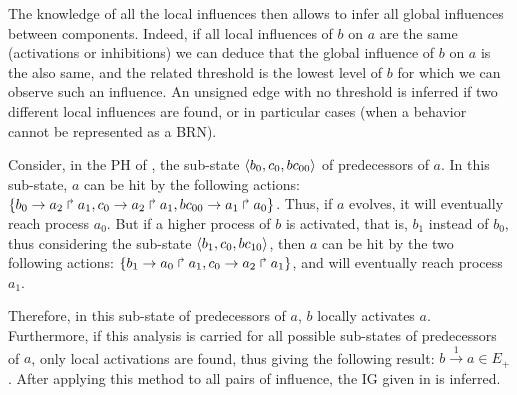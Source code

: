 The knowledge of all the local influences then allows to infer all global influences between components.
Indeed, if all local influences of $b$ on $a$ are the same (activations or inhibitions) we can deduce that the global influence of $b$ on $a$ is the also same, and the related threshold is the lowest level of $b$ for which we can observe such an influence.
An unsigned edge with no threshold is inferred if two different local influences are found, or in particular cases (when a behavior cannot be represented as a BRN).

\begin{example*}
Consider, in the PH of , the sub-state $\langle b_0, c_0, bc_{00} \rangle$ of predecessors of $a$.
In this sub-state, $a$ can be hit by the following actions: $\{b_0\rightarrow a_2\Rsh a_1, c_0\rightarrow a_2\Rsh a_1, bc_{00}\rightarrow a_1\Rsh a_0\}$.
Thus, if $a$ evolves, it will eventually reach process $a_0$.
But if a higher process of $b$ is activated, that is, $b_1$ instead of $b_0$, thus considering the sub-state $\langle b_1, c_0, bc_{10} \rangle$,
then $a$ can be hit by the two following actions: $\{b_1\rightarrow a_0\Rsh a_1, c_0\rightarrow a_2\Rsh a_1\}$,
and will eventually reach process $a_1$.

Therefore, in this sub-state of predecessors of $a$, $b$ locally activates $a$.
Furthermore, if this analysis is carried for all possible sub-states of predecessors of $a$, only local activations are found,
thus giving the following result: $b \xrightarrow{1} a \in E_+$.
After applying this method to all pairs of influence, the IG given in  is inferred.
\end{example*}
